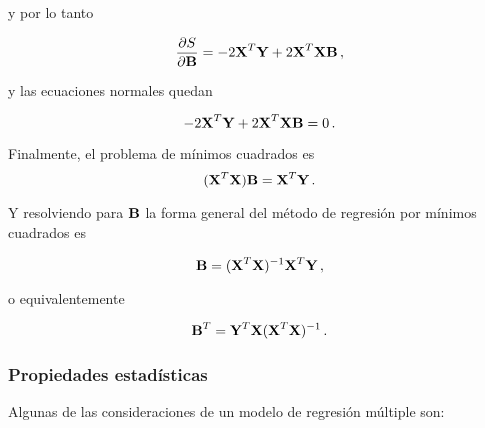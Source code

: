 \documentclass[
]{agujournal2019}
\begin{document}
y por lo tanto

\[\frac{\partial{S}}{\partial{\textbf B}}=-2{\textbf X}^T{\textbf Y}+2{\textbf X}^T{\textbf X}{\textbf B}\,,\]

y las ecuaciones normales quedan

\[-2{\textbf X}^T{\textbf Y}+2{\textbf X}^T{\textbf X}{\textbf
B}=0\,.\]

\noindent Finalmente, el problema de mínimos cuadrados es
\[({\textbf X}^T{\textbf X}){\textbf B}={\textbf X}^T{\textbf Y}\,.\]

Y resolviendo para \({\textbf B}\) la forma general del método de
regresión por mínimos cuadrados es

\[{\textbf B}=({\textbf X}^T{\textbf X})^{-1}{\textbf X}^T{\textbf Y}\,,\]

o equivalentemente

\[{\textbf B}^T={\textbf Y}^T{\textbf X}({\textbf X}^T{\textbf X})^{-1}\,.\]

\vspace{0.5cm}

\hypertarget{propiedades-estaduxedsticas}{%
\subsubsection{Propiedades
estadísticas}\label{propiedades-estaduxedsticas}}

Algunas de las consideraciones de un modelo de regresión múltiple son:
\end{document}
